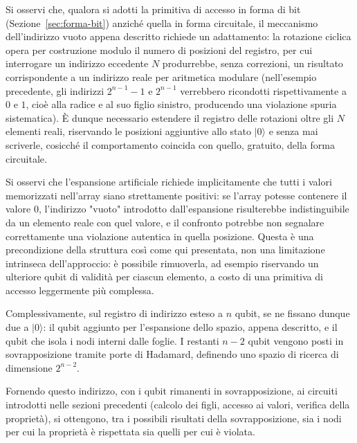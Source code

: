 Si osservi che, qualora si adotti la primitiva di accesso in forma di bit (Sezione~\ref{sec:forma-bit}) anziché quella in forma circuitale, il meccanismo dell'indirizzo vuoto appena descritto richiede un adattamento: la rotazione ciclica opera per costruzione modulo il numero di posizioni del registro, per cui interrogare un indirizzo eccedente $N$ produrrebbe, senza correzioni, un risultato corrispondente a un indirizzo reale per aritmetica modulare (nell'esempio precedente, gli indirizzi $2^{n-1}-1$ e $2^{n-1}$ verrebbero ricondotti rispettivamente a $0$ e $1$, cioè alla radice e al suo figlio sinistro, producendo una violazione spuria sistematica). È dunque necessario estendere il registro delle rotazioni oltre gli $N$ elementi reali, riservando le posizioni aggiuntive allo stato $|0\rangle$ e senza mai scriverle, cosicché il comportamento coincida con quello, gratuito, della forma circuitale.

Si osservi che l'espansione artificiale richiede implicitamente che tutti i valori memorizzati nell'array siano strettamente positivi: se l'array potesse contenere il valore $0$, l'indirizzo "vuoto" introdotto dall'espansione risulterebbe indistinguibile da un elemento reale con quel valore, e il confronto potrebbe non segnalare correttamente una violazione autentica in quella posizione. Questa è una precondizione della struttura così come qui presentata, non una limitazione intrinseca dell'approccio: è possibile rimuoverla, ad esempio riservando un ulteriore qubit di validità per ciascun elemento, a costo di una primitiva di accesso leggermente più complessa.

Complessivamente, sul registro di indirizzo esteso a $n$ qubit, se ne fissano dunque due a $|0\rangle$: il qubit aggiunto per l'espansione dello spazio, appena descritto, e il qubit che isola i nodi interni dalle foglie. I restanti $n - 2$ qubit vengono posti in sovrapposizione tramite porte di Hadamard, definendo uno spazio di ricerca di dimensione $2^{n-2}$.

Fornendo questo indirizzo, con i qubit rimanenti in sovrapposizione, ai circuiti introdotti nelle sezioni precedenti (calcolo dei figli, accesso ai valori, verifica della proprietà), si ottengono, tra i possibili risultati della sovrapposizione, sia i nodi per cui la proprietà è rispettata sia quelli per cui è violata.

